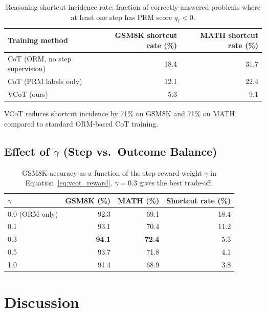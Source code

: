 \documentclass[11pt,a4paper]{article}
\begin{document}
\begin{table}[H]
\centering
\caption{Reasoning shortcut incidence rate: fraction of correctly-answered problems
where at least one step has PRM score $q_\ell < 0$.}
\begin{tabular}{lrr}
\toprule
\textbf{Training method} & \textbf{GSM8K shortcut rate (\%)} & \textbf{MATH shortcut rate (\%)} \\
\midrule
CoT (ORM, no step supervision) & 18.4 & 31.7 \\
CoT (PRM labels only)          & 12.1 & 22.4 \\
VCoT (ours)                    & 5.3  & 9.1  \\
\bottomrule
\end{tabular}
\label{tab:shortcuts}
\end{table}

VCoT reduces shortcut incidence by 71\% on GSM8K and 71\% on MATH compared to
standard ORM-based CoT training.

\subsection{Effect of $\gamma$ (Step vs.\ Outcome Balance)}

\begin{table}[H]
\centering
\caption{GSM8K accuracy as a function of the step reward weight $\gamma$ in
Equation~\ref{eq:vcot_reward}. $\gamma=0.3$ gives the best trade-off.}
\begin{tabular}{lrrr}
\toprule
$\gamma$ & \textbf{GSM8K (\%)} & \textbf{MATH (\%)} & \textbf{Shortcut rate (\%)} \\
\midrule
0.0 (ORM only) & 92.3 & 69.1 & 18.4 \\
0.1            & 93.1 & 70.4 & 11.2 \\
0.3            & \textbf{94.1} & \textbf{72.4} & 5.3 \\
0.5            & 93.7 & 71.8 & 4.1 \\
1.0            & 91.4 & 68.9 & 3.8 \\
\bottomrule
\end{tabular}
\label{tab:gamma}
\end{table}

\section{Discussion}
\label{sec:discussion}
\end{document}
